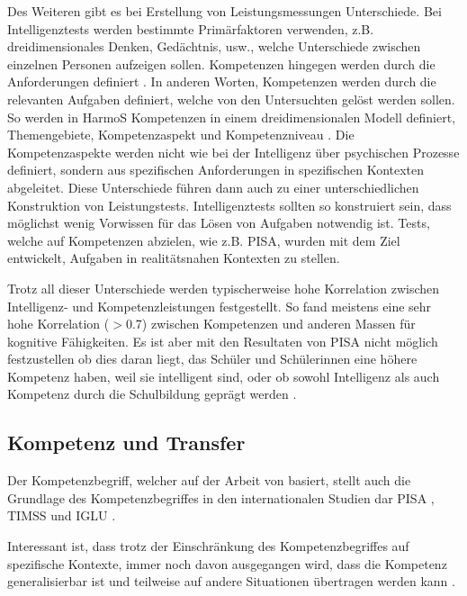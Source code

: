 Des Weiteren gibt es bei Erstellung von Leistungsmessungen Unterschiede. Bei Intelligenztests werden bestimmte Primärfaktoren verwenden, z.B. dreidimensionales Denken, Gedächtnis, usw., welche Unterschiede zwischen einzelnen Personen aufzeigen sollen. Kompetenzen hingegen werden durch die Anforderungen definiert \citep{Rychen}. In anderen Worten, Kompetenzen werden durch die relevanten Aufgaben definiert, welche von den Untersuchten gelöst werden sollen. So werden in HarmoS Kompetenzen in einem dreidimensionalen Modell definiert, Themengebiete, Kompetenzaspekt und Kompetenzniveau \citep{KonsotriumHarmoSNaturwissenschaften+2010}. Die Kompetenzaspekte werden nicht wie bei der Intelligenz über psychischen Prozesse definiert, sondern aus spezifischen Anforderungen in spezifischen Kontexten abgeleitet. Diese Unterschiede führen dann auch zu einer unterschiedlichen Konstruktion von Leistungstests. Intelligenztests sollten so konstruiert sein, dass möglichst wenig Vorwissen für das Lösen von Aufgaben notwendig ist. Tests, welche auf Kompetenzen abzielen, wie z.B. PISA, wurden mit dem Ziel entwickelt, Aufgaben in realitätsnahen  Kontexten zu stellen. 

Trotz all dieser Unterschiede werden typischerweise hohe Korrelation zwischen Intelligenz- und Kompetenzleistungen festgestellt. So fand \citet{Rindermann2006} meistens eine sehr hohe Korrelation ($ > $0.7) zwischen Kompetenzen und anderen Massen für kognitive Fähigkeiten. Es ist aber mit den Resultaten von PISA nicht möglich festzustellen ob dies daran liegt, das Schüler und Schülerinnen eine höhere Kompetenz haben, weil sie intelligent sind, oder ob sowohl Intelligenz als auch Kompetenz durch die Schulbildung geprägt werden \citep{Hartig2006}.



\subsection{Kompetenz und Transfer}
Der Kompetenzbegriff, welcher auf der Arbeit von \citet{Klieme2004, Weinert2001b} basiert, stellt auch die Grundlage des Kompetenzbegriffes in den internationalen Studien dar PISA \citep{PISA-KonsortiumDeuschland2004}, TIMSS \citep{Martin2003} und IGLU \citep{Bos2003}.

Interessant ist, dass trotz der Einschränkung des Kompetenzbegriffes auf spezifische Kontexte, immer noch davon ausgegangen wird, dass die Kompetenz generalisierbar ist und teilweise auf andere Situationen übertragen werden kann \citet{Hartig2006}.

